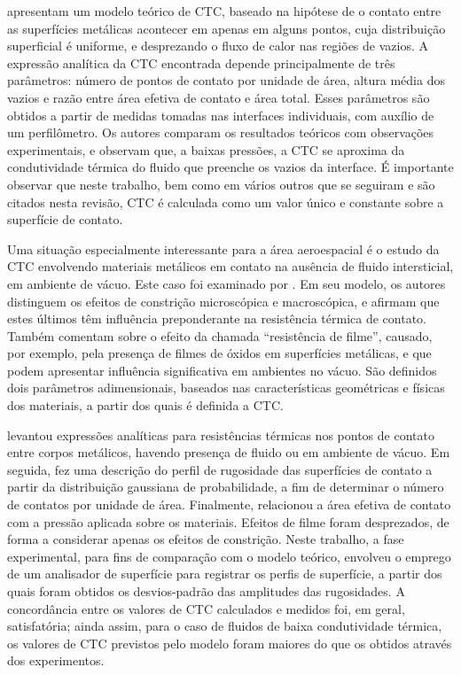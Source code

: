 \cite{artigo_fenech} apresentam um modelo
teórico de CTC, baseado na hipótese de o contato entre as superfícies metálicas acontecer em apenas em alguns pontos, cuja distribuição superficial
é uniforme, e desprezando o fluxo de calor
nas regiões de vazios. A expressão analítica da CTC encontrada depende principalmente de três parâmetros: número de pontos de contato por unidade
de área, altura média dos vazios e razão entre área efetiva de contato e área total. Esses parâmetros são obtidos a partir de medidas tomadas nas
interfaces individuais, com auxílio de um perfilômetro. Os autores comparam os resultados teóricos com observações experimentais, e observam que,
a baixas pressões, a CTC se aproxima da condutividade térmica do fluido que preenche os vazios da interface. É importante observar que neste trabalho, bem como em vários outros que se seguiram e são citados nesta revisão, CTC é calculada como um valor único e constante sobre a superfície de contato.

Uma situação especialmente interessante para a área aeroespacial é o estudo da CTC envolvendo materiais metálicos em contato na ausência de fluido intersticial, em ambiente de vácuo. Este caso foi examinado por \cite{artigo_clausing}.
Em seu modelo, os autores distinguem os efeitos de constrição microscópica e macroscópica, e afirmam que estes últimos têm influência preponderante
na resistência térmica de contato. Também comentam sobre o efeito da chamada ``resistência de filme'', causado, por exemplo, pela presença de
filmes de óxidos em superfícies metálicas, e que podem apresentar influência significativa em ambientes no vácuo. São definidos dois parâmetros adimensionais, baseados nas características geométricas e
físicas dos materiais, a partir dos quais é definida a CTC. 

\cite{tese_mikic} levantou expressões analíticas para resistências térmicas nos pontos de contato entre corpos metálicos, havendo presença de
fluido ou em ambiente de vácuo. Em seguida, fez uma descrição do perfil de rugosidade das superfícies de contato
a partir da distribuição gaussiana de probabilidade, a fim de determinar o número de contatos por unidade de área. Finalmente, relacionou a área efetiva de 
contato com a pressão aplicada sobre os materiais. Efeitos de filme foram desprezados, de forma a considerar apenas os efeitos de constrição.
Neste trabalho, a fase experimental, para fins de comparação com o modelo teórico, envolveu o emprego de um analisador de superfície para registrar os perfis de superfície, a partir dos quais foram obtidos
os desvios-padrão das amplitudes das rugosidades. A concordância entre os valores de CTC calculados e medidos foi, em geral, satisfatória; ainda assim,
para o caso de fluidos de baixa condutividade térmica, os valores de CTC previstos pelo modelo foram maiores do que os obtidos através dos experimentos. 

